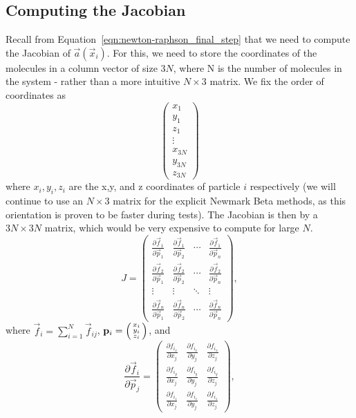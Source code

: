 \documentclass[../Main.tex]{subfiles}
\begin{document}
\subsection{Computing the Jacobian}

Recall from Equation~\ref{eqn:newton-raphson_final_step} that we need to compute the Jacobian of $\vec{a}\left(\vec{x}_{i}\right)$. For this, we need to store the coordinates of the molecules in a column vector of size $3N$, where N is the number of molecules in the system - rather than a more intuitive $N \times 3$ matrix. We fix the order of coordinates as
$$
\begin{pmatrix}
	x_{1} \\ y_{1} \\ z_{1} \\
	\vdots \\
	x_{3N} \\ y_{3N} \\ z_{3N}
\end{pmatrix}  
$$ where $x_{i}, y_{i}, z_{i}$ are the x,y, and z coordinates of particle $i$ respectively (we will continue to use an $N \times 3$ matrix for the explicit Newmark Beta methods, as this orientation is proven to be faster during tests). The Jacobian is then by a $3N \times 3N$ matrix, which would be very expensive to compute for large $N$.
$$
\renewcommand\arraystretch{1.5}
J = \begin{pmatrix}
\frac{\partial \vec{f}_{1}}{\partial \vec{p}_{1}} & \frac{\partial \vec{f}_{1}}{\partial \vec{p}_{2}} & \cdots & \frac{\partial \vec{f}_{1}}{\partial \vec{p}_{n}} \\
\frac{\partial \vec{f}_{2}}{\partial \vec{p}_{1}} & \frac{\partial \vec{f}_{2}}{\partial \vec{p}_{2}} & \cdots & \frac{\partial \vec{f}_{2}}{\partial \vec{p}_{n}} \\
\vdots & \vdots & \ddots & \vdots \\
\frac{\partial \vec{f}_{n}}{\partial \vec{p}_{1}} & \frac{\partial \vec{f}_{n}}{\partial \vec{p}_{2}} & \cdots & \frac{\partial \vec{f}_{n}}{\partial \vec{p}_{n}}
\end{pmatrix},
$$
where $\vec{f}_{i} = \sum_{i=1}^{N} \vec{f}_{ij}$, $\vec{p}_{i} = \begin{psmallmatrix} x_{i} \\ y_{i} \\ z_{i} \end{psmallmatrix}$, and \\
$$
\renewcommand\arraystretch{1.5}
\frac{\partial \vec{f}_{i}}{\partial \vec{p}_{j}} =
	\begin{pmatrix}
		\frac{\partial f_{i_{x}}}{\partial x_{j}}  & \frac{\partial f_{i_{x}}}{\partial y_{j}} & \frac{\partial f_{i_{x}}}{\partial z_{j}} \\
		\frac{\partial f_{i_{y}}}{\partial x_{j}}  & \frac{\partial f_{i_{y}}}{\partial y_{j}} & \frac{\partial f_{i_{y}}}{\partial z_{j}} \\
		\frac{\partial f_{i_{z}}}{\partial x_{j}}  & \frac{\partial f_{i_{z}}}{\partial y_{j}} & \frac{\partial f_{i_{z}}}{\partial z_{j}} 	
	\end{pmatrix},
$$
\end{document}
